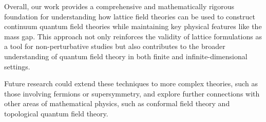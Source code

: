 Overall, our work provides a comprehensive and mathematically rigorous foundation for understanding how lattice field theories can be used to construct continuum quantum field theories while maintaining key physical features like the mass gap. This approach not only reinforces the validity of lattice formulations as a tool for non-perturbative studies but also contributes to the broader understanding of quantum field theory in both finite and infinite-dimensional settings.

Future research could extend these techniques to more complex theories, such as those involving fermions or supersymmetry, and explore further connections with other areas of mathematical physics, such as conformal field theory and topological quantum field theory.

